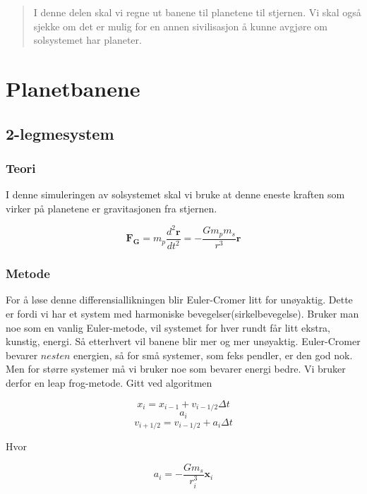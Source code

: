\documentclass[a4paper,norsk,11pt,twoside]{article}
\begin{document}
\newpage

\begin{abstract}
I denne delen skal vi regne ut banene til planetene til stjernen. Vi skal også sjekke om det er mulig for en annen sivilisasjon å kunne avgjøre om solsystemet har planeter.
\end{abstract}

\section{Planetbanene}

\subsection{2-legmesystem}

\subsubsection{Teori}

I denne simuleringen av solsystemet skal vi bruke at denne eneste kraften som virker på planetene er gravitasjonen fra stjernen. 

\begin{equation}
\textbf{F}_\textbf{G} = m_p \frac{d^{2}\textbf{r}}{dt^{2}} = -\frac{Gm_p m_s}{r^{3}}\textbf{r}
\end{equation}

\subsubsection{Metode}

For å løse denne differensiallikningen blir Euler-Cromer litt for unøyaktig. Dette er fordi vi har et system med harmoniske bevegelser(sirkelbevegelse). Bruker man noe som en vanlig Euler-metode, vil systemet for hver rundt får litt ekstra, kunstig, energi. Så etterhvert vil banene blir mer og mer unøyaktig. Euler-Cromer bevarer $nesten$ energien, så for små systemer, som feks pendler, er den god nok. Men for større systemer må vi bruker noe som bevarer energi bedre. Vi bruker derfor en leap frog-metode. Gitt ved algoritmen

$$
x_i = x_{i-1} + v_{i-1/2} \Delta t 
$$
$$
a_i
$$
$$
v_{i+1/2} = v_{i-1/2} + a_i \Delta t
$$

Hvor

\begin{equation}
a_i = -\frac{Gm_s}{r_i^{3}}\textbf{x}_i
\end{equation}
\end{document}
